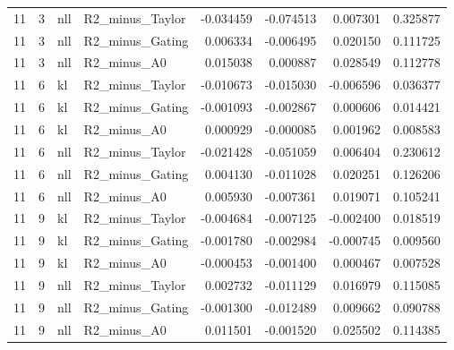 \begin{tabular}{rrllrrrr}
11 & 3 & nll & R2_minus_Taylor & -0.034459 & -0.074513 & 0.007301 & 0.325877 \\
11 & 3 & nll & R2_minus_Gating & 0.006334 & -0.006495 & 0.020150 & 0.111725 \\
11 & 3 & nll & R2_minus_A0 & 0.015038 & 0.000887 & 0.028549 & 0.112778 \\
11 & 6 & kl & R2_minus_Taylor & -0.010673 & -0.015030 & -0.006596 & 0.036377 \\
11 & 6 & kl & R2_minus_Gating & -0.001093 & -0.002867 & 0.000606 & 0.014421 \\
11 & 6 & kl & R2_minus_A0 & 0.000929 & -0.000085 & 0.001962 & 0.008583 \\
11 & 6 & nll & R2_minus_Taylor & -0.021428 & -0.051059 & 0.006404 & 0.230612 \\
11 & 6 & nll & R2_minus_Gating & 0.004130 & -0.011028 & 0.020251 & 0.126206 \\
11 & 6 & nll & R2_minus_A0 & 0.005930 & -0.007361 & 0.019071 & 0.105241 \\
11 & 9 & kl & R2_minus_Taylor & -0.004684 & -0.007125 & -0.002400 & 0.018519 \\
11 & 9 & kl & R2_minus_Gating & -0.001780 & -0.002984 & -0.000745 & 0.009560 \\
11 & 9 & kl & R2_minus_A0 & -0.000453 & -0.001400 & 0.000467 & 0.007528 \\
11 & 9 & nll & R2_minus_Taylor & 0.002732 & -0.011129 & 0.016979 & 0.115085 \\
11 & 9 & nll & R2_minus_Gating & -0.001300 & -0.012489 & 0.009662 & 0.090788 \\
11 & 9 & nll & R2_minus_A0 & 0.011501 & -0.001520 & 0.025502 & 0.114385 \\
\bottomrule
\end{tabular}
